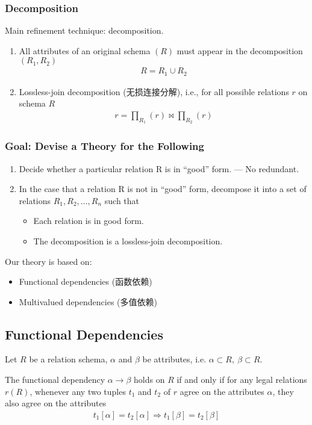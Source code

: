 \subsubsection{Decomposition}
Main refinement technique: decomposition. 
\begin{enumerate}\small
    \item All attributes of an original schema $(R)$ must appear in the decomposition $(R_1, R_2)$
    \begin{align*}
        R=R_1 \cup R_2
    \end{align*}
    \item Lossless-join decomposition (无损连接分解), i.e., for all possible relations $r$ on schema $R$
    \begin{align*}
        r=\prod_{R_1}(r)\bowtie  \prod_{R_2}(r)
    \end{align*}
\end{enumerate}

\subsubsection{Goal: Devise a Theory for the Following}
\begin{enumerate}\small
    \item Decide whether a particular relation R is in ``good'' form. --- No redundant. 
    \item In the case that a relation R is not in ``good'' form, decompose it into a set of relations ${R_1, R_2, \dots, R_n}$ such that
    \begin{itemize}
        \item Each relation is in good form.
        \item The decomposition is a lossless-join decomposition.
    \end{itemize}
\end{enumerate}

Our theory is based on:
\begin{itemize}
    \item Functional dependencies (函数依赖)
    \item Multivalued dependencies (多值依赖)
\end{itemize}

\subsection{Functional Dependencies}
\begin{definition}
    Let $R$ be a relation schema, $\alpha$ and $\beta$ be attributes, i.e. $\alpha \subset R,\ \beta \subset R$. 
    
    The functional dependency $\alpha \rightarrow \beta$ holds on $R$ if and only if for any legal relations $r(R)$, whenever any two tuples $t_1$ and $t_2$ of $r$ agree on the attributes $\alpha$, they also agree on the attributes
    \begin{align*}
        t_1[\alpha]=t_2[\alpha] \Rightarrow t_1[\beta]=t_2[\beta]
    \end{align*}
\end{definition}

